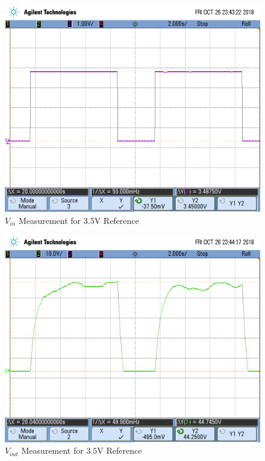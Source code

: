 \FloatBarrier

\begin{figure}[h!]
	\centering
	\includegraphics[scale=0.75]{../images/scope_10.png}
	\caption{$V_{in}$ Measurement for $3.5$\si{\volt} Reference}
	\label{fig:scope_10}
\end{figure}

\FloatBarrier

\FloatBarrier

\begin{figure}[h!]
	\centering
	\includegraphics[scale=0.75]{../images/scope_11.png}
	\caption{$V_{out}$ Measurement for $3.5$\si{\volt} Reference}
	\label{fig:scope_11}
\end{figure}

